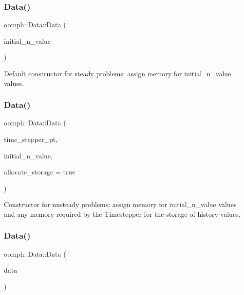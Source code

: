 \subsubsection{\texorpdfstring{Data()}{Data()}\hspace{0.1cm}{\footnotesize\ttfamily [2/4]}}
{\footnotesize\ttfamily oomph\+::\+Data\+::\+Data (\begin{DoxyParamCaption}\item[{const unsigned \&}]{initial\+\_\+n\+\_\+value }\end{DoxyParamCaption})}



Default constructor for steady problems\+: assign memory for initial\+\_\+n\+\_\+value values. 

\mbox{\label{classoomph_1_1Data_afe56d22d0dba308e33191e922993c5ee}} 
\subsubsection{\texorpdfstring{Data()}{Data()}\hspace{0.1cm}{\footnotesize\ttfamily [3/4]}}
{\footnotesize\ttfamily oomph\+::\+Data\+::\+Data (\begin{DoxyParamCaption}\item[{\hyperlink{classoomph_1_1TimeStepper}{Time\+Stepper} $\ast$const \&}]{time\+\_\+stepper\+\_\+pt,  }\item[{const unsigned \&}]{initial\+\_\+n\+\_\+value,  }\item[{const bool \&}]{allocate\+\_\+storage = {\ttfamily true} }\end{DoxyParamCaption})}



Constructor for unsteady problems\+: assign memory for initial\+\_\+n\+\_\+value values and any memory required by the Timestepper for the storage of history values. 

\mbox{\label{classoomph_1_1Data_a196816030b33f26c011cb45bce2f6897}} 
\subsubsection{\texorpdfstring{Data()}{Data()}\hspace{0.1cm}{\footnotesize\ttfamily [4/4]}}
{\footnotesize\ttfamily oomph\+::\+Data\+::\+Data (\begin{DoxyParamCaption}\item[{const \hyperlink{classoomph_1_1Data}{Data} \&}]{data }\end{DoxyParamCaption})\hspace{0.3cm}{\ttfamily [inline]}}



